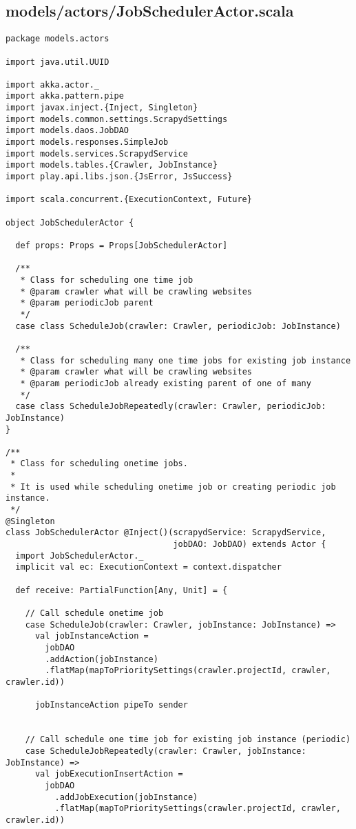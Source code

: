 \subsection{models/actors/JobSchedulerActor.scala}
\begin{lstlisting}
package models.actors

import java.util.UUID

import akka.actor._
import akka.pattern.pipe
import javax.inject.{Inject, Singleton}
import models.common.settings.ScrapydSettings
import models.daos.JobDAO
import models.responses.SimpleJob
import models.services.ScrapydService
import models.tables.{Crawler, JobInstance}
import play.api.libs.json.{JsError, JsSuccess}

import scala.concurrent.{ExecutionContext, Future}

object JobSchedulerActor {

  def props: Props = Props[JobSchedulerActor]

  /**
   * Class for scheduling one time job
   * @param crawler what will be crawling websites
   * @param periodicJob parent
   */
  case class ScheduleJob(crawler: Crawler, periodicJob: JobInstance)

  /**
   * Class for scheduling many one time jobs for existing job instance
   * @param crawler what will be crawling websites
   * @param periodicJob already existing parent of one of many
   */
  case class ScheduleJobRepeatedly(crawler: Crawler, periodicJob: JobInstance)
}

/**
 * Class for scheduling onetime jobs.
 *
 * It is used while scheduling onetime job or creating periodic job instance.
 */
@Singleton
class JobSchedulerActor @Inject()(scrapydService: ScrapydService,
                                  jobDAO: JobDAO) extends Actor {
  import JobSchedulerActor._
  implicit val ec: ExecutionContext = context.dispatcher

  def receive: PartialFunction[Any, Unit] = {

    // Call schedule onetime job
    case ScheduleJob(crawler: Crawler, jobInstance: JobInstance) =>
      val jobInstanceAction =
        jobDAO
        .addAction(jobInstance)
        .flatMap(mapToPrioritySettings(crawler.projectId, crawler, crawler.id))

      jobInstanceAction pipeTo sender


    // Call schedule one time job for existing job instance (periodic)
    case ScheduleJobRepeatedly(crawler: Crawler, jobInstance: JobInstance) =>
      val jobExecutionInsertAction =
        jobDAO
          .addJobExecution(jobInstance)
          .flatMap(mapToPrioritySettings(crawler.projectId, crawler, crawler.id))


\end{lstlisting}
